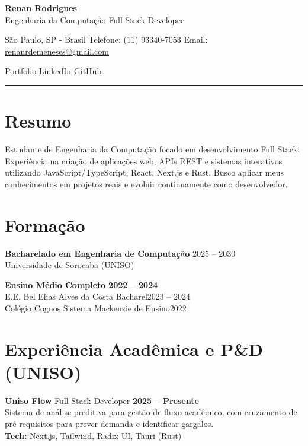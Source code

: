 \documentclass[10pt,a4paper]{article}
\begin{document}
{\Large\textbf{Renan Rodrigues}}\\
Engenharia da Computação \textbar{} Full Stack Developer

\vspace{2pt}
São Paulo, SP - Brasil \textbar{}
Telefone: (11) 93340-7053 \textbar{}
Email: \href{mailto:renanrdemeneses@gmail.com}{renanrdemeneses@gmail.com}

\href{https://renanrod.vercel.app/}{Portfolio} \textbar{}
\href{https://linkedin.com/in/renanrod4}{LinkedIn} \textbar{}
\href{https://github.com/renanrod4}{GitHub}

\vspace{2pt}\hrule\vspace{2pt}

\section*{Resumo}
Estudante de Engenharia da Computação focado em desenvolvimento Full Stack. Experiência na criação de aplicações web, APIs REST e sistemas interativos utilizando JavaScript/TypeScript, React, Next.js e Rust. Busco aplicar meus conhecimentos em projetos reais e evoluir continuamente como desenvolvedor.

\section*{Formação}
\textbf{Bacharelado em Engenharia de Computação} \hfill 2025 -- 2030\\
Universidade de Sorocaba (UNISO)

\textbf{Ensino Médio Completo} \hfill \textbf{2022 -- 2024}\\
E.E. Bel Elias Alves da Costa Bacharel\hfill 2023 -- 2024\\
Colégio Cognos Sistema Mackenzie de Ensino\hfill{2022}\\

\section*{Experiência Acadêmica e P\&D (UNISO)}
\textbf{Uniso Flow} \textbar{} Full Stack Developer \hfill \textbf{2025 -- Presente}\\
Sistema de análise preditiva para gestão de fluxo acadêmico, com cruzamento de pré-requisitos para prever demanda e identificar gargalos.\\
\textbf{Tech:} Next.js, Tailwind, Radix UI, Tauri (Rust)
\end{document}
